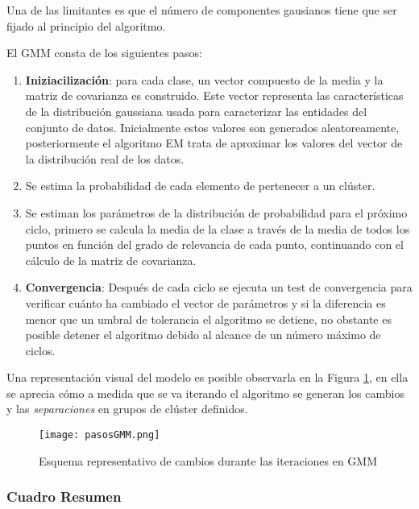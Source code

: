 Una de las limitantes es que el número de componentes gausianos tiene que ser fijado al principio
del algoritmo.

El GMM consta de los siguientes pasos:

\begin{enumerate}
	
	\item \textbf{Iniziacilización}: para cada clase, un vector compuesto de la media y la matriz de covarianza es construido. Este vector representa las características de la distribución gaussiana usada para caracterizar las entidades del conjunto de datos. Inicialmente estos valores son generados aleatoreamente, posteriormente el algoritmo EM trata de aproximar los valores del vector de la distribución real de los datos. 
	
	\item Se estima la probabilidad de cada elemento de pertenecer a un clúster.
	
	\item Se estiman los parámetros de la distribución de probabilidad para el próximo ciclo, primero se calcula la media de la clase a través de la media de todos los puntos en función del grado de relevancia de cada punto, continuando con el cálculo de la matriz de covarianza.
	
	\item \textbf{Convergencia}: Después de cada ciclo se ejecuta un test de convergencia para verificar cuánto ha cambiado el vector de parámetros y si la diferencia es menor que un umbral de tolerancia el algoritmo se detiene, no obstante es posible detener el algoritmo debido al alcance de un número máximo de ciclos.
	
\end{enumerate}

Una representación visual del modelo es posible observarla en la Figura  \ref{esquemaR}, en ella se aprecia cómo a medida que se va iterando el algoritmo se generan los cambios y las \textit{separaciones} en grupos de clúster definidos.

\begin{figure}[!h]
	
	\centering
	\texttt{[image: pasosGMM.png]}
	\caption{Esquema representativo de cambios durante las iteraciones en GMM}
	\label{esquemaR}
\end{figure}

\subsubsection{Cuadro Resumen}

